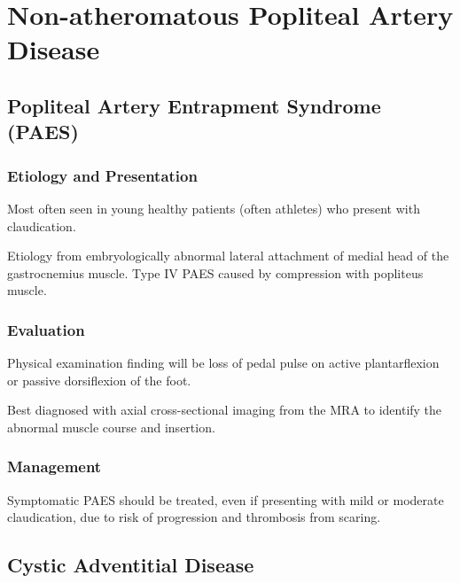 \documentclass[
]{book}
\begin{document}
\hypertarget{non-atheromatous-popliteal-artery-disease}{%
\section{Non-atheromatous Popliteal Artery Disease}\label{non-atheromatous-popliteal-artery-disease}}

\hypertarget{popliteal-artery-entrapment-syndrome-paes}{%
\subsection{Popliteal Artery Entrapment Syndrome (PAES)}\label{popliteal-artery-entrapment-syndrome-paes}}

\hypertarget{etiology-and-presentation-2}{%
\subsubsection{Etiology and Presentation}\label{etiology-and-presentation-2}}

Most often seen in young healthy patients (often athletes) who present
with claudication.

Etiology from embryologically abnormal lateral attachment of medial head
of the gastrocnemius muscle.\citep{gokkus2014, lejay2014} Type IV PAES
caused by compression with popliteus muscle.

\hypertarget{evaluation-14}{%
\subsubsection{Evaluation}\label{evaluation-14}}

Physical examination finding will be loss of pedal pulse on active
plantarflexion or passive dorsiflexion of the foot.\citep{gokkus2014, lejay2014}

Best diagnosed with axial cross-sectional imaging from the MRA to
identify the abnormal muscle course and insertion. \citep{sinha2012, lejay2014}

\hypertarget{management-21}{%
\subsubsection{Management}\label{management-21}}

Symptomatic PAES should be treated, even if presenting with mild or
moderate claudication, due to risk of progression and thrombosis from
scaring.\citep{forbes2019}

\hypertarget{cystic-adventitial-disease}{%
\subsection{Cystic Adventitial Disease}\label{cystic-adventitial-disease}}
\end{document}
